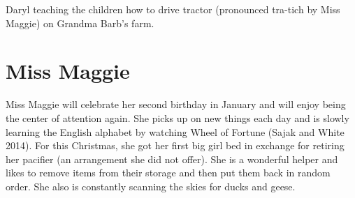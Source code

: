 \documentclass{article}
\makeatletter
\newenvironment{figurehere}
  {\def\@captype{figure}}
  {}
\makeatother
\begin{document}
\begin{multicols}{2}
\begin{figurehere}
 \centering   
 \caption{Daryl teaching the children how to drive tractor (pronounced tra-tich by Miss Maggie)
on Grandma Barb's farm.}
\end{figurehere}

\section{Miss Maggie}

Miss Maggie will celebrate her second birthday in January and will enjoy 
being the center of attention again.  She picks up on new things each day 
and is slowly learning the English alphabet by watching Wheel of Fortune
 (Sajak and White 2014).  For this Christmas, she got 
her first big girl bed in exchange for retiring her pacifier (an 
arrangement she did not offer).  She is a wonderful helper and likes to remove items
from their storage and then put them back in random order.  She also is
constantly scanning the skies for ducks and geese.


\end{multicols}
\end{document}
